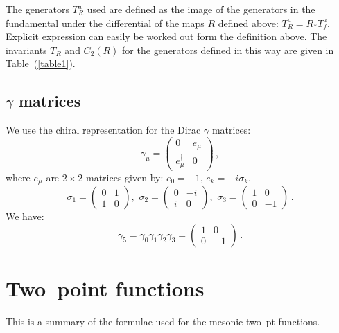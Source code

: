 \documentclass{article}[12pt]
\begin{document}
The generators $T_R^a$ used are defined as the image of the generators in the fundamental
under the differential of the maps $R$ defined above: $T^a_R = R_* T^a_f$.
Explicit expression can easily be worked out form the definition above.
The invariants $T_R$ and $C_2(R)$ for the generators defined in this way are given in 
Table~(\ref{table1}).

\subsection{$\gamma$ matrices}
We use the chiral representation for the Dirac $\gamma$ matrices:
\begin{equation}
\gamma_\mu=
\begin{pmatrix}
0&e_\mu\\
e_\mu^\dagger&0
\end{pmatrix}\, ,
\end{equation}
where $e_\mu$ are $2\times 2$ matrices given by: $e_0=-1$, $e_k=-i\sigma_k$,
\begin{equation}
\sigma_1=
\begin{pmatrix}
0&1\\
1&0
\end{pmatrix},\,\,
\sigma_2=
\begin{pmatrix}
0&-i\\
i&0
\end{pmatrix},\,\,
\sigma_3=
\begin{pmatrix}
1&0\\
0&-1
\end{pmatrix}\, .
\end{equation}
We have:
\begin{equation}
\gamma_5=\gamma_0\gamma_1\gamma_2\gamma_3=
\begin{pmatrix}
1&0\\
0&-1
\end{pmatrix}\, .
\end{equation}



\section{Two--point functions}
This is a summary of the formulae used for the mesonic two--pt
functions. 

\bigskip
\end{document}
